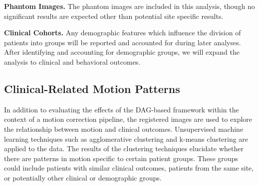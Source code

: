 \textbf{Phantom Images.} The phantom images are included in this analysis, though no significant results are expected other than potential site specific results.

\textbf{Clinical Cohorts.} Any demographic features which influence the division of patients into groups will be reported and accounted for during later analyses. After identifying and accounting for demographic groups, we will expand the analysis to clinical and behavioral outcomes.


\subsection{Clinical-Related Motion Patterns} %

In addition to evaluating the effects of the DAG-based framework within the context of a motion correction pipeline, the registered images are used to explore the relationship between motion and clinical outcomes. Unsupervised machine learning techniques such as agglomerative clustering and k-means clustering are applied to the data. The results of the clustering techniques elucidate whether there are patterns in motion specific to certain patient groups. These groups could include patients with similar clinical outcomes, patients from the same site, or potentially other clinical or demographic groups.




